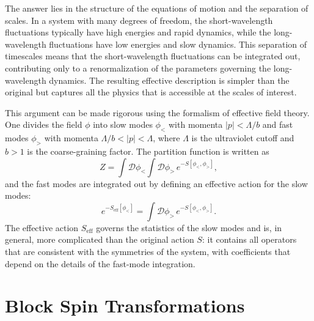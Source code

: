 \documentclass[11pt, twoside, openright]{book}
\theoremstyle{dotted}
\theoremstyle{definition}
\begin{document}
The answer lies in the structure of the equations of motion and the separation of
scales. In a system with many degrees of freedom, the short-wavelength fluctuations
typically have high energies and rapid dynamics, while the long-wavelength
fluctuations have low energies and slow dynamics. This separation of timescales
means that the short-wavelength fluctuations can be integrated out, contributing
only to a renormalization of the parameters governing the long-wavelength dynamics.
The resulting effective description is simpler than the original but captures all
the physics that is accessible at the scales of interest.

This argument can be made rigorous using the formalism of effective field theory.
One divides the field $\phi$ into slow modes $\phi_<$ with momenta $|p| < \Lambda/b$
and fast modes $\phi_>$ with momenta $\Lambda/b < |p| < \Lambda$, where $\Lambda$
is the ultraviolet cutoff and $b > 1$ is the coarse-graining factor. The partition
function is written as
\begin{equation}
  Z = \int \mathcal{D}\phi_< \int \mathcal{D}\phi_> \, e^{-S[\phi_<, \phi_>]},
  \label{eq:partition_split}
\end{equation}
and the fast modes are integrated out by defining an effective action for the slow
modes:
\begin{equation}
  e^{-S_{\text{eff}}[\phi_<]} = \int \mathcal{D}\phi_> \, e^{-S[\phi_<, \phi_>]}.
  \label{eq:eff_action_def}
\end{equation}
The effective action $S_{\text{eff}}$ governs the statistics of the slow modes and
is, in general, more complicated than the original action $S$: it contains all
operators that are consistent with the symmetries of the system, with coefficients
that depend on the details of the fast-mode integration.

\section{Block Spin Transformations}
\end{document}
